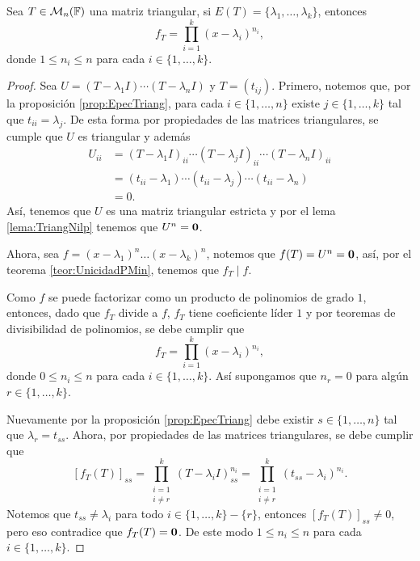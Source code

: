 \begin{teor}\label{teor:MinPolyTriang}
  Sea $T\in\mathcal{M}_n(\mathbb{F})$ una matriz triangular, si $E(T) = \{\lambda_1,\ldots,\lambda_k\}$, entonces
    \[
      f_T = \prod_{i=1}^k (x-\lambda_i)^{n_i},
    \]
  donde $1 \leq n_i \leq n$ para cada $i \in \{1,\ldots,k\}$.
\end{teor}
\begin{proof}
  Sea $U = (T-\lambda_1 I)\cdots(T-\lambda_n I)$ y $T = (t_{ij})$. Primero, notemos que, por la proposición \ref{prop:EpecTriang}, para cada $i \in \{1,\ldots,n\}$ existe $j\in\{1,\ldots,k\}$ tal que $t_{ii} = \lambda_j$. De esta forma por propiedades de las matrices triangulares, se cumple que $U$ es triangular y además
  \begin{align*}
    U_{ii} &= (T-\lambda_1 I)_{ii}\cdots(T-\lambda_j I)_{ii}\cdots(T-\lambda_n I)_{ii}  \\
      &= (t_{ii}-\lambda_1)\cdots(t_{ii}-\lambda_j)\cdots(t_{ii}-\lambda_n)  \\
      &= 0.
  \end{align*}
  Así, tenemos que $U$ es una matriz triangular estricta y por el lema \ref{lema:TriangNilp} tenemos que $U^n = \mathbf{0}$.

  Ahora, sea $f = (x-\lambda_1)^n\ldots(x-\lambda_k)^n$, notemos que $f(T) = U^n = \mathbf{0}$, así, por el teorema \ref{teor:UnicidadPMin}, tenemos que $f_T \mid f$.
  
  Como $f$ se puede factorizar como un producto de polinomios de grado $1$, entonces, dado que $f_T$ divide a $f$, $f_T$ tiene coeficiente líder $1$ y por teoremas de divisibilidad de polinomios, se debe cumplir que
    \[
      f_T = \prod_{i=1}^k (x-\lambda_i)^{n_i},
    \]
donde $0 \leq n_i \leq n$ para cada $i \in \{1,\ldots,k\}$. Así supongamos que $n_r = 0$ para algún $r \in \{1,\ldots,k\}$.

Nuevamente por la proposición \ref{prop:EpecTriang} debe existir $s \in \{1,\ldots,n\}$ tal que $\lambda_r = t_{ss}$. Ahora, por propiedades de las matrices triangulares, se debe cumplir que
  \[
    [f_T(T)]_{ss} 
      = \prod_{\substack{i=1\\i\neq r}}^k (T-\lambda_i I)_{ss}^{n_i} 
      = \prod_{\substack{i=1\\i\neq r}}^k (t_{ss}-\lambda_i)^{n_i}.
  \]
Notemos que $t_{ss} \neq \lambda_i$ para todo $i \in \{1,\ldots,k\}-\{r\}$, entonces $[f_T(T)]_{ss} \neq 0$, pero eso contradice que $f_T(T) = \mathbf{0}$. De este modo $1 \leq n_i \leq n$ para cada $i \in \{1,\ldots,k\}$.
\end{proof}

